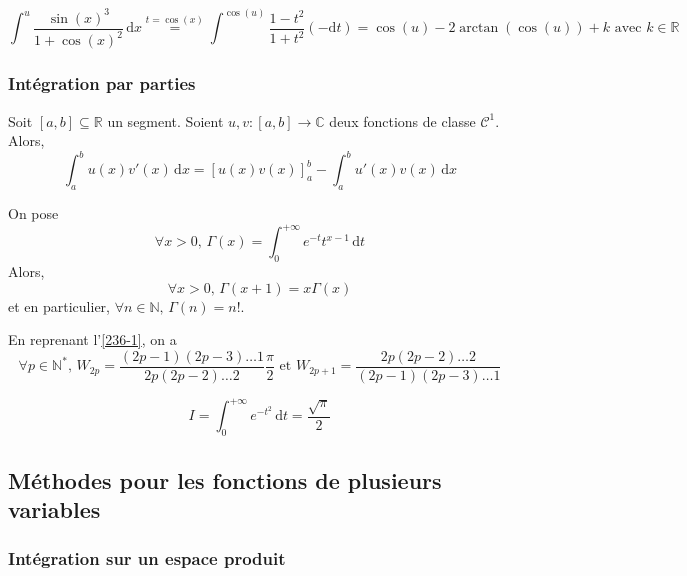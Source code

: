 	\begin{example}
		\[ \int^u \frac{\sin(x)^3}{1+\cos(x)^2} \, \mathrm{d}x \overset{t = \cos(x)}{=} \int^{\cos(u)} \frac{1-t^2}{1+t^2} (-\mathrm{d}t) = \cos(u) - 2\arctan(\cos(u)) + k \text{ avec } k \in \mathbb{R} \]
	\end{example}

	\subsubsection{Intégration par parties}


	\begin{theorem}
		Soit $[a,b] \subseteq \mathbb{R}$ un segment. Soient $u, v : [a,b] \rightarrow \mathbb{C}$ deux fonctions de classe $\mathcal{C}^1$. Alors,
		\[ \int_a^b u(x)v'(x) \, \mathrm{d}x = \left[ u(x) v(x) \right]_a^b - \int_a^b u'(x) v(x) \, \mathrm{d}x \]
	\end{theorem}


	\begin{example}
		\label{236-2}
		On pose
		\[ \forall x > 0, \, \Gamma(x) = \int_0^{+\infty} e^{-t} t^{x-1} \, \mathrm{d}t \]
		Alors,
		\[ \forall x > 0, \, \Gamma(x+1) = x \Gamma(x) \]
		et en particulier, $\forall n \in \mathbb{N}, \, \Gamma(n) = n!$.
	\end{example}


	\begin{example}
		En reprenant l'\cref{236-1}, on a
		\[ \forall p \in \mathbb{N}^*, \, W_{2p} = \frac{(2p-1)(2p-3) \dots 1}{2p (2p-2) \dots 2} \frac{\pi}{2} \text{ et } W_{2p+1} = \frac{2p (2p-2) \dots 2}{(2p-1)(2p-3) \dots 1} \]
	\end{example}


	\begin{application}
		\[ I = \int_0^{+\infty} e^{-t^2} \, \mathrm{d}t = \frac{\sqrt{\pi}}{2} \]
	\end{application}

	\subsection{Méthodes pour les fonctions de plusieurs variables}

	\subsubsection{Intégration sur un espace produit}

